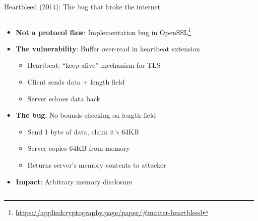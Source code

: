 \documentclass[aspectratio=169, lualatex, handout]{beamer}
\begin{document}
\begin{frame}{Heartbleed (2014): The bug that broke the internet}
	\begin{columns}[c]
		\begin{column}{1\textwidth}
			\begin{itemize}[<+->]
				\item \textbf{Not a protocol flaw}: Implementation bug in OpenSSL\footnote{\url{https://appliedcryptography.page/paper/\#matter-heartbleed}}
				\item \textbf{The vulnerability}: Buffer over-read in heartbeat extension
				      \begin{itemize}
					      \item Heartbeat: ``keep-alive'' mechanism for TLS
					      \item Client sends data + length field
					      \item Server echoes data back
				      \end{itemize}
				\item \textbf{The bug}: No bounds checking on length field
				      \begin{itemize}
					      \item Send 1 byte of data, claim it's 64KB
					      \item Server copies 64KB from memory
					      \item Returns server's memory contents to attacker
				      \end{itemize}
				\item \textbf{Impact}: Arbitrary memory disclosure
			\end{itemize}
		\end{column}
	\end{columns}
\end{frame}
\end{document}

